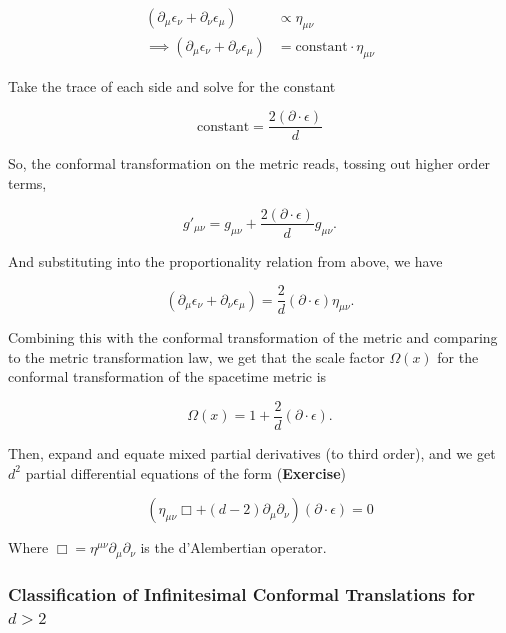 \begin{align}
(\partial_\mu \epsilon_\nu + \partial_\nu \epsilon_\mu) &\propto \eta_{\mu\nu} \\
\implies (\partial_\mu \epsilon_\nu + \partial_\nu \epsilon_\mu) &= \text{constant} \cdot \eta_{\mu\nu}
\end{align}

\noindent Take the trace of each side and solve for the constant

\begin{equation}
\text{constant} = \frac{2 (\partial \cdot \epsilon)}{d}
\end{equation}

\noindent So, the conformal transformation on the metric reads, tossing out higher order terms,

\begin{equation}
g'_{\mu\nu} = g_{\mu\nu} + \frac{2 (\partial \cdot \epsilon)}{d} g_{\mu\nu}.
\end{equation}

\noindent And substituting into the proportionality relation from above, we have

\begin{equation}
(\partial_\mu \epsilon_\nu + \partial_\nu \epsilon_\mu) = \frac{2}{d} (\partial \cdot \epsilon) \eta_{\mu\nu}.
\end{equation}

\noindent Combining this with the conformal transformation of the metric and comparing to the metric transformation law, we get that the scale factor $\Omega(x)$ for the conformal transformation of the spacetime metric is 

\begin{equation}
\Omega(x) = 1+\frac{2}{d} (\partial \cdot \epsilon).
\end{equation}

\noindent Then, expand and equate mixed partial derivatives (to third order), and we get $d^2$ partial differential equations of the form (\textbf{Exercise})

\begin{equation}
(\eta_{\mu\nu} \Box + (d-2) \partial_\mu \partial_\nu) (\partial \cdot \epsilon) = 0
\end{equation}

\noindent Where $\Box = \eta^{\mu\nu} \partial_\mu \partial_\nu$ is the d'Alembertian operator.

\subsubsection*{Classification of Infinitesimal Conformal Translations for $d>2$}

